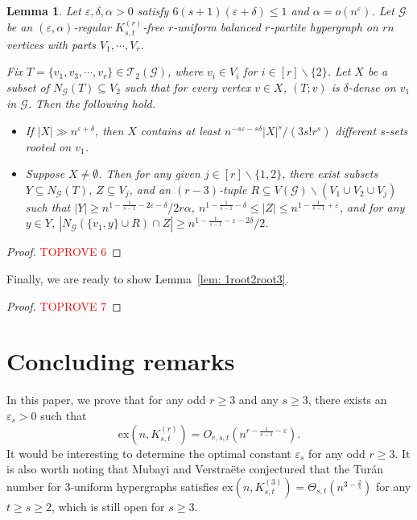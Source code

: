 \documentclass[11pt]{article}
\newtheorem{lem}[dfn]{Lemma}
\def\ex{\mathrm{ex}}
\begin{document}
\begin{lem}\label{lem: reduce to bipartite}
Let $\varepsilon, \delta, \alpha>0$ satisfy $6(s+1)(\varepsilon + \delta)\le 1$ and $\alpha=o\left(n^{\varepsilon}\right)$.
Let $\mathcal G$ be an $(\varepsilon,\alpha)$-regular $K_{s,t}^{(r)}$-free $r$-uniform balanced $r$-partite hypergraph on $rn$ vertices with parts $V_1,\cdots, V_r$.

Fix $T=\{v_1,v_3,\cdots, v_r\}\in \mathcal T_2(\mathcal G)$, where $v_i\in V_i$ for $i\in [r]\backslash \{2\}$.
Let $X$ be a subset of $N_{\mathcal G}(T)\subseteq V_2$ such that for every vertex $v\in X$, $(T;v)$ is $\delta $-dense on $v_1$ in $\mathcal G$.
Then the following hold.
\begin{itemize}
\item[(1).] If $|X|\gg n^{\varepsilon+\delta}$, then $X$ contains at least $n^{-s\varepsilon-s\delta }|X|^s/(3s!r^s)$ different $s$-sets rooted on $v_{1}$.
\item[(2).] Suppose $X\neq \emptyset$. Then for any given $j\in [r]\backslash \{1,2\}$,
there exist subsets $Y\subseteq N_{\mathcal G}(T)$, $Z\subseteq V_j$, and an $(r-3)$-tuple $R\subseteq V(\mathcal G)\backslash (V_1\cup V_2\cup V_j)$ such that $|Y|\ge n^{1-\frac{1}{s-1}- 2 \varepsilon -\delta}/2r\alpha$, $n^{1-\frac{1}{s-1}-\delta} \le |Z| \le n^{1-\frac{1}{s-1} +\varepsilon}$, and for any $y \in Y$, $|N_{\mathcal G}(\{v_1, y\}\cup R)\cap Z|\ge n^{1-\frac{1}{s-1} - \varepsilon-2\delta}/2$.
\end{itemize}
\end{lem}
\begin{proof}\textcolor{red}{TOPROVE 6}\end{proof}

Finally, we are ready to show Lemma~\ref{lem: 1root2root3}.

\begin{proof}\textcolor{red}{TOPROVE 7}\end{proof}


\section{Concluding remarks}
In this paper, we prove that for any odd $r\geq 3$ and any $s\geq 3$, there exists an $\varepsilon_s>0$ such that
$$\ex(n,K_{s,t}^{(r)})=O_{r,s,t} \left(n^{r-\frac{1}{s-1}- \varepsilon}\right).$$
It would be interesting to determine the optimal constant $\varepsilon_s$ for any odd $r\geq 3$.
It is also worth noting that Mubayi and Verstra\"ete \cite{MuVe04} conjectured that the Tur\'an number for 3-uniform hypergraphs satisfies
$\ex(n,K_{s,t}^{(3)})=\Theta_{s,t}\left(n^{3-\frac{2}{s}}\right)$ for any $t\geq s\geq 2$,
which is still open for $s\geq 3$.
\end{document}
